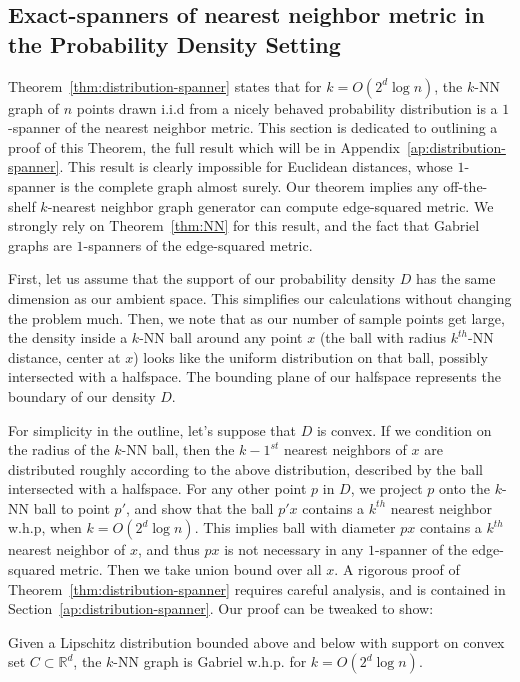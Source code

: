 \subsection{Exact-spanners of nearest neighbor metric in
the Probability Density Setting
}\label{sec:distribution-spanner}

Theorem~\ref{thm:distribution-spanner} states that for $k= O(2^d \log n)$, the $k$-NN graph of $n$ points drawn i.i.d from
a nicely behaved probability distribution is a $1$-spanner of the
nearest neighbor metric. This section is dedicated to outlining a proof of
this Theorem, the full result which will be in
Appendix~\ref{ap:distribution-spanner}.
This result is clearly impossible for Euclidean distances,
whose $1$-spanner is the complete graph almost surely.  
Our theorem implies any off-the-shelf
$k$-nearest neighbor graph generator can compute
edge-squared metric.  We strongly rely on Theorem~\ref{thm:NN} for this
result, and the fact that Gabriel graphs are $1$-spanners of the
edge-squared metric.

First, let us assume that the support of our
probability density $D$ has the same dimension as our ambient space.
This simplifies our calculations without changing the problem
much. Then, we note that as our number of sample points get
large, the density inside a $k$-NN ball around any point $x$ (the ball with radius
$k^{th}$-NN
distance, center at $x$) looks like the uniform distribution
on that ball, possibly intersected with a halfspace. The bounding
plane of our halfspace
represents the boundary of our density $D$.

For simplicity in the outline, let's suppose that $D$ is convex.
If we condition on
the radius of the $k$-NN ball, then the $k-1^{st}$ nearest
neighbors of $x$ are distributed roughly according to the above
distribution, described by the ball intersected with a halfspace.
For any other point $p$ in $D$, we project $p$ onto the $k$-NN
ball to point $p'$, and show that the ball $p'x$ contains a $k^{th}$ nearest
neighbor w.h.p, when $k=O(2^d \log n)$. This
implies ball with diameter $px$ contains a $k^{th}$ nearest
neighbor of $x$, and thus $px$ is not necessary in any
$1$-spanner of the edge-squared metric. Then we take union bound
over all $x$.
A rigorous proof of
Theorem~\ref{thm:distribution-spanner} requires careful analysis, 
and is contained in
Section~\ref{ap:distribution-spanner}.  
Our proof can be tweaked to show:
\begin{theorem}
  Given a Lipschitz distribution bounded above and below with support on convex set $C \subset
  \mathbb{R}^d$, the $k$-NN graph is Gabriel w.h.p. for $k =
  O(2^d \log n)$.
\end{theorem}
